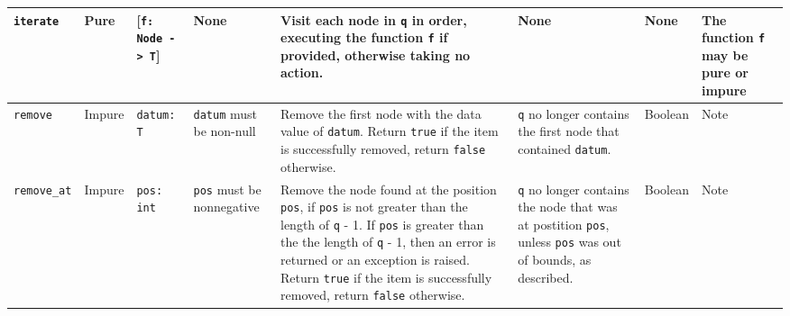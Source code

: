 \documentclass[10pt,letterpaper,final]{report}
\begin{document}
{\begin{center}
\begin{landscape}
\begin{xltabular}{\linewidth}{|l|l|X|X|X|X|X|X|}
          \verb|iterate|   & Pure   & [\verb|f: Node -> T|]             & None                                                          & Visit each node in \verb|q| in order, executing the function \verb|f| if provided, otherwise taking no action.                                                                                                                                                                                                                & None                                                                                                                                                         & None     & The function \verb|f| may be pure or impure                                                                                                                     \\ \hline
          \verb|remove|    & Impure & \verb|datum: T|                   & \verb|datum| must be non-null                                 & Remove the first node with the data value of \verb|datum|. Return \verb|true| if the item is successfully removed, return \verb|false| otherwise.                                                                                                                                                                             & \verb|q| no longer contains the first node that contained \verb|datum|.                                                                                      & Boolean  & Note                                                                                                                                                            \\ \hline
          \verb|remove_at| & Impure & \verb|pos: int|                   & \verb|pos| must be nonnegative                                & Remove the node found at the position \verb|pos|, if \verb|pos| is not greater than the length of \verb|q| - 1. If \verb|pos| is greater than the the length of \verb|q| - 1, then an error is returned or an exception is raised. Return \verb|true| if the item is successfully removed, return \verb|false| otherwise.     & \verb|q| no longer contains the node that was at postition \verb|pos|, unless \verb|pos| was out of bounds, as described.                                    & Boolean  & Note                                                                                                                                                            \\ \hline

\end{xltabular}
\end{landscape}
\end{center}}
\end{document}
